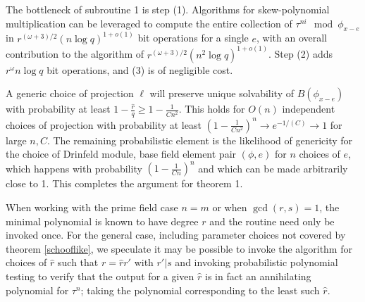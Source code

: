 \documentclass[sigconf]{acmart}
\newcommand{\hatr}{\hat{r}}
\begin{document}
The bottleneck of subroutine 1 is step (1). Algorithms for skew-polynomial multiplication can be leveraged to compute the entire collection of $\tau^{ni} \mod \phi_{x - e}$ in $r^{(\omega+3)/2}(n \log q)^{1 + o(1)}$ bit operations for a single $e$, with an overall contribution to the algorithm of $r^{(\omega+3)/2}(n^2 \log q)^{1 + o(1)}$. Step (2) adds $r^{\omega}n\log q$ bit operations, and (3) is of negligible cost. 

A generic choice of projection $\ell$ will preserve unique solvability of $B(\phi_{x-e})$ with probability at least $1 - \frac{\hatr}{q} \geq 1 - \frac{1}{Cn^2} $. This holds for $O(n)$ independent choices of projection with probability at least $(1 - \frac{1}{Cn^2})^n \to e^{-1/(C)} \to 1$ for large $n, C$. The remaining probabilistic element is the likelihood of genericity for the choice of Drinfeld module, base field element pair $(\phi, e)$ for $n$ choices of $e$, which happens with probability $(1 - \frac{1}{Cn})^{n}$ and which can be made arbitrarily close to 1. This completes the argument for theorem 1.

When working with the prime field case $n = m$ or when $\gcd(r, s) = 1$, the minimal polynomial is known to have degree $r$ and the routine need only be invoked once. For the general case, including parameter choices not covered by theorem \ref{schooflike}, we speculate it may be possible to invoke the algorithm for choices of $\hat{r}$ such that $r = \hat{r} r'$ with $r' | s$ and invoking probabilistic polynomial testing to verify that the output for a given $\hat{r}$ is in fact an annihilating polynomial for $\tau^n$; taking the polynomial corresponding to the least such $\hat{r}$.

    
\end{document}
